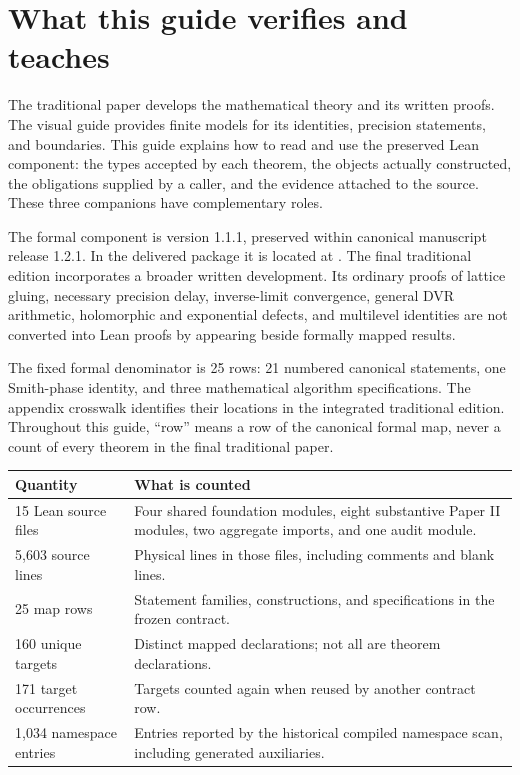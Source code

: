\section{What this guide verifies and teaches}\label{sec:orientation}

The traditional paper develops the mathematical theory and its written proofs. The visual guide provides finite models for its identities, precision statements, and boundaries. This guide explains how to read and use the preserved Lean component: the types accepted by each theorem, the objects actually constructed, the obligations supplied by a caller, and the evidence attached to the source. These three companions have complementary roles.

The formal component is version 1.1.1, preserved within canonical manuscript release 1.2.1. In the delivered package it is located at . The final traditional edition incorporates a broader written development. Its ordinary proofs of lattice gluing, necessary precision delay, inverse-limit convergence, general DVR arithmetic, holomorphic and exponential defects, and multilevel identities are not converted into Lean proofs by appearing beside formally mapped results.

The fixed formal denominator is 25 rows: 21 numbered canonical statements, one Smith-phase identity, and three mathematical algorithm specifications. The appendix crosswalk identifies their locations in the integrated traditional edition. Throughout this guide, ``row'' means a row of the canonical formal map, never a count of every theorem in the final traditional paper.

\begin{tabular}{p{}p{}}
\toprule Quantity & What is counted \\\midrule
15 Lean source files & Four shared foundation modules, eight substantive Paper II modules, two aggregate imports, and one audit module. \\
5,603 source lines & Physical lines in those files, including comments and blank lines. \\
25 map rows & Statement families, constructions, and specifications in the frozen contract. \\
160 unique targets & Distinct mapped declarations; not all are theorem declarations. \\
171 target occurrences & Targets counted again when reused by another contract row. \\
1,034 namespace entries & Entries reported by the historical compiled namespace scan, including generated auxiliaries. \\
\bottomrule
\end{tabular}

